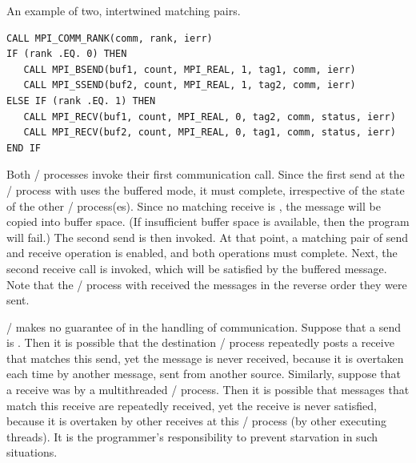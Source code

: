 \begin{example}
\label{pt2pt-exF}
%
%
%
An example of two, intertwined matching pairs.
\begin{lstlisting}[language={[MPI]Fortran}]
CALL MPI_COMM_RANK(comm, rank, ierr)
IF (rank .EQ. 0) THEN
   CALL MPI_BSEND(buf1, count, MPI_REAL, 1, tag1, comm, ierr)
   CALL MPI_SSEND(buf2, count, MPI_REAL, 1, tag2, comm, ierr)
ELSE IF (rank .EQ. 1) THEN
   CALL MPI_RECV(buf1, count, MPI_REAL, 0, tag2, comm, status, ierr)
   CALL MPI_RECV(buf2, count, MPI_REAL, 0, tag1, comm, status, ierr)
END IF
\end{lstlisting}
Both \MPI/ processes invoke their first communication call.
Since the first send at the \MPI/ process with  uses the buffered mode, it must complete,
irrespective of the state of the other \MPI/ process(es).  Since no matching receive is
, the message will be copied into buffer space.  (If insufficient
buffer space is available, then the program will fail.)
The second send is then invoked.
At that point, a matching pair of send and receive
operation is enabled, and both operations must complete.
Next, the second receive call is invoked, which will be satisfied by the buffered
message. Note that the \MPI/ process with  received the messages in the reverse order they
were sent.
\end{example}

\MPI/ makes no guarantee of  in the handling of
communication.  Suppose that a send is .  Then it is possible
that the destination \MPI/ process repeatedly posts a receive that matches this
send, yet the message is never received, because it is overtaken each time by
another message, sent from another source.  Similarly, suppose that a
receive was  by a multithreaded \MPI/ process.  Then it is possible that
messages that
match this receive are repeatedly received, yet the receive is never satisfied,
because it is overtaken by other receives  at this \MPI/ process (by
other executing threads).  It is the programmer's responsibility to prevent
starvation in such situations.


